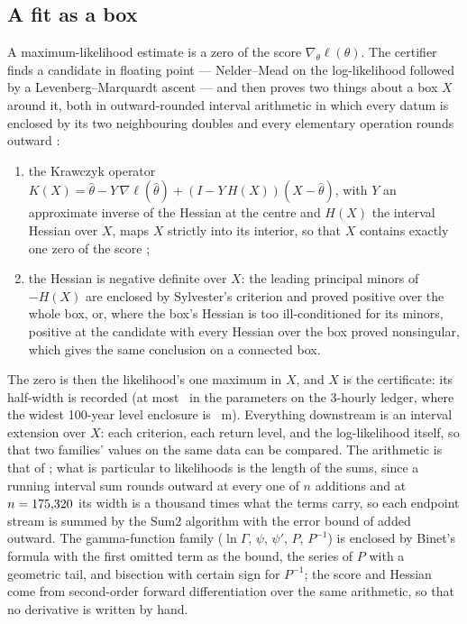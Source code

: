 \documentclass[preprint,11pt,authoryear]{elsarticle}
\begin{document}
\subsection{A fit as a box}\label{sec:box}
A maximum-likelihood estimate is a zero of the score $\nabla_\theta \ell(\theta)$. The certifier finds a candidate in floating point --- Nelder--Mead on the log-likelihood followed by a Levenberg--Marquardt ascent --- and then proves two things about a box $X$ around it, both in outward-rounded interval arithmetic in which every datum is enclosed by its two neighbouring doubles and every elementary operation rounds outward \citep{moore2009}:
\begin{enumerate}
\item the Krawczyk operator $K(X) = \hat\theta - Y\,\nabla\ell(\hat\theta) + (I - Y\,H(X))(X - \hat\theta)$, with $Y$ an approximate inverse of the Hessian at the centre and $H(X)$ the interval Hessian over $X$, maps $X$ strictly into its interior, so that $X$ contains exactly one zero of the score \citep{krawczyk1969,rump2010};
\item the Hessian is negative definite over $X$: the leading principal minors of $-H(X)$ are enclosed by Sylvester's criterion and proved positive over the whole box, or, where the box's Hessian is too ill-conditioned for its minors, positive at the candidate with every Hessian over the box proved nonsingular, which gives the same conclusion on a connected box.
\end{enumerate}
The zero is then the likelihood's one maximum in $X$, and $X$ is the certificate: its half-width is recorded (at most \RMaxBox\ in the parameters on the 3-hourly ledger, where the widest 100-year level enclosure is \RWidestLevel\ m). Everything downstream is an interval extension over $X$: each criterion, each return level, and the log-likelihood itself, so that two families' values on the same data can be compared. The arithmetic is that of \citet[\S3]{certmethod}; what is particular to likelihoods is the length of the sums, since a running interval sum rounds outward at every one of $n$ additions and at $n = 175{,}320$ its width is a thousand times what the terms carry, so each endpoint stream is summed by the Sum2 algorithm with the error bound of \citet{ogita2005} added outward. The gamma-function family ($\ln\Gamma$, $\psi$, $\psi'$, $P$, $P^{-1}$) is enclosed by Binet's formula with the first omitted term as the bound, the series of $P$ with a geometric tail, and bisection with certain sign for $P^{-1}$; the score and Hessian come from second-order forward differentiation over the same arithmetic, so that no derivative is written by hand.
\end{document}
